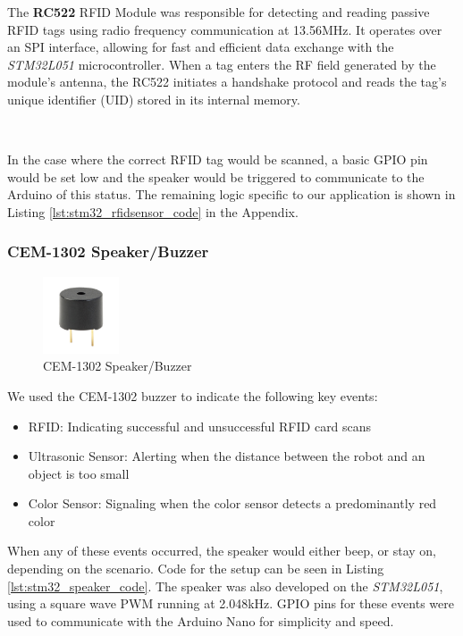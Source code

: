 \documentclass{article}
\begin{document}
The \textbf{RC522} RFID Module was responsible for detecting and reading passive RFID tags using radio frequency communication at 13.56MHz. It operates over an SPI interface, allowing for fast and efficient data exchange with the \emph{STM32L051} microcontroller. When a tag enters the RF field generated by the module’s antenna, the RC522 initiates a handshake protocol and reads the tag’s unique identifier (UID) stored in its internal memory.

\

In the case where the correct RFID tag would be scanned, a basic GPIO pin would be set low and the speaker would be triggered to communicate to the Arduino of this status. The remaining logic specific to our application is shown in Listing \ref{lst:stm32_rfidsensor_code} in the Appendix.

\subsubsection{CEM-1302 Speaker/Buzzer}
\label{sec:speaker}
\begin{figure}[H]
    \centering
    \includegraphics[width=0.2\textwidth]{Figures/speaker.png} %
    \caption{CEM-1302 Speaker/Buzzer}
    \label{fig:speaker}
\end{figure}



We used the CEM-1302 buzzer to indicate the following key events:
\begin{itemize}
    \item RFID: Indicating successful and unsuccessful RFID card scans
    \item Ultrasonic Sensor: Alerting when the distance between the robot and an object is too small
    \item Color Sensor: Signaling when the color sensor detects a predominantly red color
\end{itemize}

When any of these events occurred, the speaker would either beep, or stay on, depending on the scenario. Code for the setup can be seen in Listing \ref{lst:stm32_speaker_code}. The speaker was also developed on the \emph{STM32L051}, using a square wave PWM running at 2.048kHz. GPIO pins for these events were used to communicate with the Arduino Nano for simplicity and speed.
\end{document}
